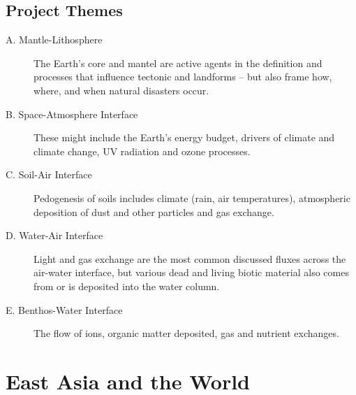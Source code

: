 \subsection{Project Themes}

\begin{description}
	\item[A. Mantle-Lithosphere] The Earth's core and mantel are active agents in the definition and processes that influence tectonic and landforms -- but also frame how, where, and when natural disasters occur. 
	\item[B. Space-Atmosphere Interface] These might include the Earth's energy budget, drivers of climate and climate change, UV radiation and ozone processes.
	\item[C. Soil-Air Interface] Pedogenesis of soils includes climate (rain, air temperatures), atmospheric deposition of dust and other particles and gas exchange. 
	\item[D. Water-Air Interface] Light and gas exchange are the most common discussed fluxes across the air-water interface, but various dead and living biotic material also comes from or is deposited into the water column.
	\item[E. Benthos-Water Interface] The flow of ions, organic matter deposited, gas and nutrient exchanges.
\end{description}

\section{East Asia and the World}